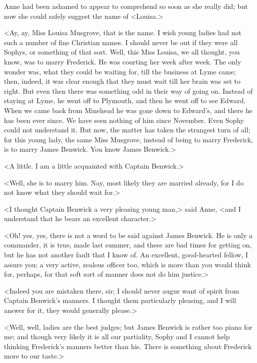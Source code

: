Anne had been ashamed to appear to comprehend so soon as she really did; but now she could safely suggest the name of <Louisa.>

<Ay, ay, Miss Louisa Musgrove, that is the name. I wish young ladies had not such a number of fine Christian names. I should never be out if they were all Sophys, or something of that sort. Well, this Miss Louisa, we all thought, you know, was to marry Frederick. He was courting her week after week. The only wonder was, what they could be waiting for, till the business at Lyme came; then, indeed, it was clear enough that they must wait till her brain was set to right. But even then there was something odd in their way of going on. Instead of staying at Lyme, he went off to Plymouth, and then he went off to see Edward. When we came back from Minehead he was gone down to Edward's, and there he has been ever since. We have seen nothing of him since November. Even Sophy could not understand it. But now, the matter has taken the strangest turn of all; for this young lady, the same Miss Musgrove, instead of being to marry Frederick, is to marry James Benwick. You know James Benwick.>

<A little. I am a little acquainted with Captain Benwick.>

<Well, she is to marry him. Nay, most likely they are married already, for I do not know what they should wait for.>

<I thought Captain Benwick a very pleasing young man,> said Anne, <and I understand that he bears an excellent character.>

<Oh! yes, yes, there is not a word to be said against James Benwick. He is only a commander, it is true, made last summer, and these are bad times for getting on, but he has not another fault that I know of. An excellent, good-hearted fellow, I assure you; a very active, zealous officer too, which is more than you would think for, perhaps, for that soft sort of manner does not do him justice.>

<Indeed you are mistaken there, sir; I should never augur want of spirit from Captain Benwick's manners. I thought them particularly pleasing, and I will answer for it, they would generally please.>

<Well, well, ladies are the best judges; but James Benwick is rather too piano for me; and though very likely it is all our partiality, Sophy and I cannot help thinking Frederick's manners better than his. There is something about Frederick more to our taste.>

